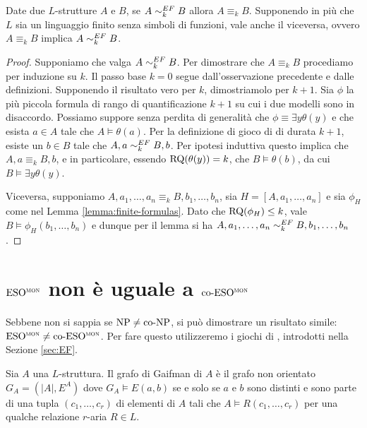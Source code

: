 \begin{teorema}
 \label{thm:ef}
 Date due $L$-strutture $A$ e $B$, se $A \sim^{EF}_k B$ allora $A \equiv_k B$.
 Supponendo in più che $L$ sia un linguaggio finito senza simboli di funzioni,
 vale anche il viceversa, ovvero $A \equiv_k B$
 implica $A \sim^{EF}_k B$.
\end{teorema}
\begin{proof}
 Supponiamo che valga $A \sim^{EF}_k B$. Per dimostrare che $A\equiv_k B$ procediamo per induzione su $k$.
 Il passo base $k=0$ segue dall'osservazione
 precedente e dalle definizioni. Supponendo il risultato vero per $k$, dimostriamolo
 per $k+1$. Sia $\phi$ la più piccola formula di rango di quantificazione $k+1$
 su cui i due modelli sono in disaccordo. Possiamo suppore senza perdita di generalità
 che $\phi \equiv \exists y \theta(y)$ e che esista $a \in A$ tale che $A \models \theta(a)$.
 Per la definizione di gioco di \EF{} di durata $k+1$, esiste un $b \in B$ tale che
 $A,a \sim^{EF}_k B,b$. Per ipotesi induttiva questo implica che
 $A,a \equiv_k B,b$, e in particolare, essendo $\operatorname{RQ}(\theta(y)) = k$, che
 $B \models \theta(b)$, da cui $B \models \exists y \theta(y)$.
 
 Viceversa, supponiamo $A,a_1,\ldots, a_n \equiv_k B, b_1, \ldots, b_n$, sia
 $H=[A,a_1,\ldots,a_n]$ e sia $\phi_H$ come nel Lemma \ref{lemma:finite-formulas}.
 Dato che $\operatorname{RQ}(\phi_H) \leq k$, vale $B \models \phi_H(b_1,\ldots,b_n)$
 e dunque per il lemma si ha $A,a_1,\ldots, a_n \sim^{EF}_k B, b_1, \ldots, b_n$.
\end{proof}


\section{\texorpdfstring{$\operatorname{ESO^{\normalfont\textsc{mon}}}$}{ESOmon} non è uguale a \texorpdfstring{$\operatorname{co-ESO^{\normalfont\textsc{mon}}}$}{co-ESOmon}}

Sebbene non si sappia se $\operatorname{NP}\neq\operatorname{co-NP}$, si può dimostrare un risultato simile: $\operatorname{ESO^{\normalfont\textsc{mon}}} \neq \operatorname{co-ESO^{\normalfont\textsc{mon}}}$.
Per fare questo utilizzeremo i giochi di \EF{}, introdotti nella Sezione \ref{sec:EF}.


\begin{definizione}
  Sia $A$ una $L$-struttura.
  Il grafo di Gaifman di $A$ è il grafo non orientato $G_A = (|A|, E^A)$ dove $G_A \models E(a,b)$ se e solo se $a$ e $b$ sono distinti e sono parte di una tupla $(c_1,\dots,c_r)$ di elementi di $A$ tali che $A\models R(c_1,\dots,c_r)$ per una qualche relazione $r$-aria $R\in L$.
\end{definizione}

